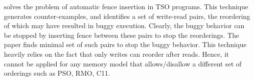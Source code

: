 \cite{abdulla-tso-fences} solves the problem of automatic fence 
insertion in TSO programs. This technique generates counter-examples,
and identifies a set of write-read pairs, the reordering of which may 
have resulted in buggy execution. Clearly, the buggy behavior can be 
stopped by inserting fence between these pairs to stop the reorderings.
The paper finds minimal set of such pairs to stop the buggy behavior.
This technique heavily relies on the fact that only writes can reorder 
after reads. Hence, it cannot be applied for any memory model that 
allows/disallow a different set of orderings such as PSO, RMO, C11.

